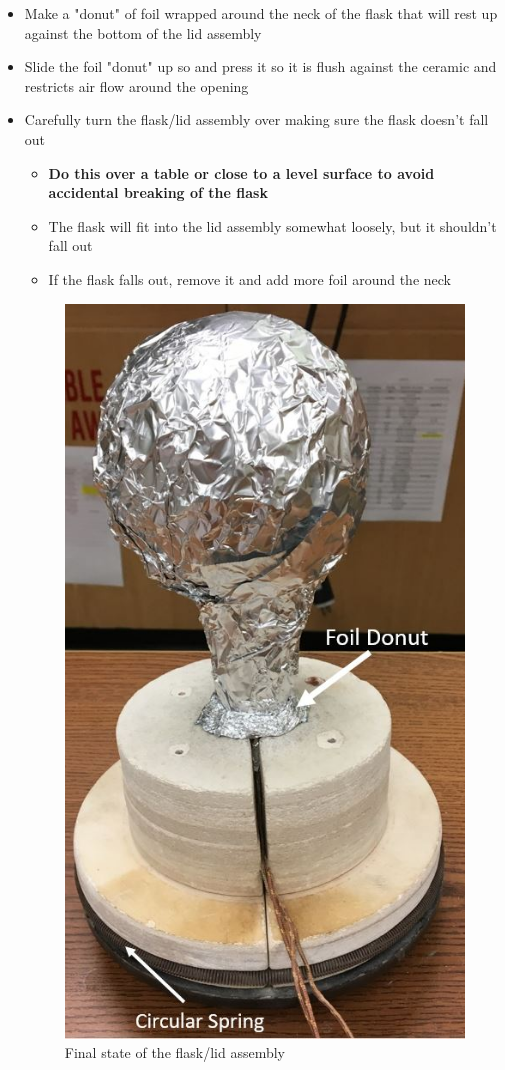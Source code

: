 \documentclass[letterpaper,11pt]{article}
\begin{document}
\begin{itemize}
\begin{itemize}
        \item Make a "donut" of foil wrapped around the neck of the flask that 
            will rest up against the bottom of the lid assembly
        \item Slide the foil "donut" up so and press it so it is flush against 
            the ceramic and restricts air flow around the opening
        \item Carefully turn the flask/lid assembly over making sure the flask 
            doesn't fall out
                \begin{itemize}
                \item \textbf{Do this over a table or close to a level surface 
                    to avoid accidental breaking of the flask}
                \item The flask will fit into the lid assembly somewhat loosely, 
                    but it shouldn't fall out
                \item If the flask falls out, remove it and add more foil 
                around the neck
                \end{itemize}
         
\begin{figure}[H]
\centering
\includegraphics[width=.45\textwidth]{insert_in_lid_w_donut.jpg}
\caption{Final state of the flask/lid assembly}
\label{fig:f_lid_done}
\end{figure}
        

\end{itemize}
\end{itemize}
\end{document}
